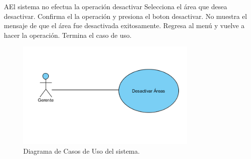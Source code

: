 \begin{UCtrayectoriaA}{A}{El sistema no efectua la operación desactivar}
			\UCpaso[\UCactor] Selecciona el área que desea desactivar.
			\UCpaso[\UCactor] Confirma el la operación y presiona el boton desactivar.
			\UCpaso No muestra el mensaje de que el área fue desactivada exitosamente.
			\UCpaso[\UCactor] Regresa al menú y vuelve a hacer la operación.
			\UCpaso[] Termina el caso de uso.
\end{UCtrayectoriaA}

\begin{figure}[htbp!]
		\centering
			\includegraphics[width=0.8\textwidth]{images/desactivarAreas}
		\caption{Diagrama de Casos de Uso del sistema.}
	\end{figure}
